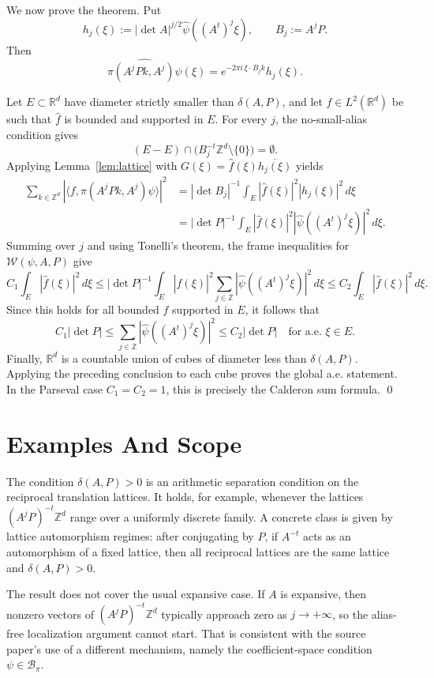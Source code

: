 \documentclass[11pt]{article}
\newcommand{\R}{\mathbb R}
\newcommand{\Z}{\mathbb Z}
\newcommand{\W}{\mathcal W}
\begin{document}
We now prove the theorem.  Put
\[
  h_j(\xi):=|\det A|^{j/2}\widehat\psi((A^t)^j\xi),
  \qquad B_j:=A^jP .
\]
Then
\[
  \widehat{\pi(A^jPk,A^j)\psi}(\xi)
  =e^{-2\pi i\,\xi\cdot B_jk}h_j(\xi).
\]

Let $E\subset\R^d$ have diameter strictly smaller than $\delta(A,P)$, and let
$f\in L^2(\R^d)$ be such that $\widehat f$ is bounded and supported in $E$.
For every $j$, the no-small-alias condition gives
\[
  (E-E)\cap \bigl(B_j^{-t}\Z^d\setminus\{0\}\bigr)=\emptyset.
\]
Applying Lemma~\ref{lem:lattice} with
$G(\xi)=\widehat f(\xi)\overline{h_j(\xi)}$ yields
\[
\begin{aligned}
  \sum_{k\in\Z^d}
  |\langle f,\pi(A^jPk,A^j)\psi\rangle|^2
  &=
  |\det B_j|^{-1}\int_E |\widehat f(\xi)|^2 |h_j(\xi)|^2\,d\xi  \\
  &=
  |\det P|^{-1}\int_E |\widehat f(\xi)|^2
      |\widehat\psi((A^t)^j\xi)|^2\,d\xi .
\end{aligned}
\]
Summing over $j$ and using Tonelli's theorem, the frame inequalities for
$\W(\psi,A,P)$ give
\[
  C_1\int_E|\widehat f(\xi)|^2\,d\xi
  \le
  |\det P|^{-1}\int_E|\widehat f(\xi)|^2
       \sum_{j\in\Z}|\widehat\psi((A^t)^j\xi)|^2\,d\xi
  \le
  C_2\int_E|\widehat f(\xi)|^2\,d\xi .
\]
Since this holds for all bounded $\widehat f$ supported in $E$, it follows
that
\[
  C_1|\det P|
  \le
  \sum_{j\in\Z}|\widehat\psi((A^t)^j\xi)|^2
  \le
  C_2|\det P|
  \quad\text{for a.e. }\xi\in E.
\]
Finally, $\R^d$ is a countable union of cubes of diameter less than
$\delta(A,P)$.  Applying the preceding conclusion to each cube proves the
global a.e. statement.  In the Parseval case $C_1=C_2=1$, this is precisely
the Calderon sum formula.
\qed

\section*{Examples And Scope}

The condition $\delta(A,P)>0$ is an arithmetic separation condition on the
reciprocal translation lattices.  It holds, for example, whenever the lattices
$(A^jP)^{-t}\Z^d$ range over a uniformly discrete family.  A concrete class is
given by lattice automorphism regimes: after conjugating by $P$, if $A^{-t}$
acts as an automorphism of a fixed lattice, then all reciprocal lattices are
the same lattice and $\delta(A,P)>0$.

The result does not cover the usual expansive case.  If $A$ is expansive, then
nonzero vectors of $(A^jP)^{-t}\Z^d$ typically approach zero as $j\to+\infty$,
so the alias-free localization argument cannot start.  That is consistent with
the source paper's use of a different mechanism, namely the coefficient-space
condition $\psi\in\mathcal B_\pi$.
\end{document}
